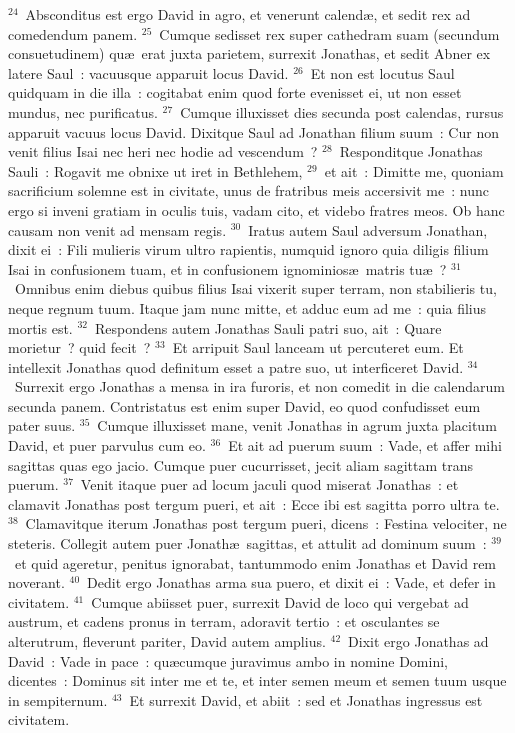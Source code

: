 ${}^{24}$~Absconditus est ergo David in agro, et venerunt calend\ae , et sedit rex ad comedendum panem.
${}^{25}$~Cumque sedisset rex super cathedram suam (secundum consuetudinem) qu\ae\ erat juxta parietem, surrexit Jonathas, et sedit Abner ex latere Saul~: vacuusque apparuit locus David.
${}^{26}$~Et non est locutus Saul quidquam in die illa~: cogitabat enim quod forte evenisset ei, ut non esset mundus, nec purificatus.
${}^{27}$~Cumque illuxisset dies secunda post calendas, rursus apparuit vacuus locus David. Dixitque Saul ad Jonathan filium suum~: Cur non venit filius Isai nec heri nec hodie ad vescendum~?
${}^{28}$~Responditque Jonathas Sauli~: Rogavit me obnixe ut iret in Bethlehem,
${}^{29}$~et ait~: Dimitte me, quoniam sacrificium solemne est in civitate, unus de fratribus meis accersivit me~: nunc ergo si inveni gratiam in oculis tuis, vadam cito, et videbo fratres meos. Ob hanc causam non venit ad mensam regis.
${}^{30}$~Iratus autem Saul adversum Jonathan, dixit ei~: Fili mulieris virum ultro rapientis, numquid ignoro quia diligis filium Isai in confusionem tuam, et in confusionem ignominios\ae\ matris tu\ae~?
${}^{31}$~Omnibus enim diebus quibus filius Isai vixerit super terram, non stabilieris tu, neque regnum tuum. Itaque jam nunc mitte, et adduc eum ad me~: quia filius mortis est.
${}^{32}$~Respondens autem Jonathas Sauli patri suo, ait~: Quare morietur~? quid fecit~?
${}^{33}$~Et arripuit Saul lanceam ut percuteret eum. Et intellexit Jonathas quod definitum esset a patre suo, ut interficeret David.
${}^{34}$~Surrexit ergo Jonathas a mensa in ira furoris, et non comedit in die calendarum secunda panem. Contristatus est enim super David, eo quod confudisset eum pater suus.
${}^{35}$~Cumque illuxisset mane, venit Jonathas in agrum juxta placitum David, et puer parvulus cum eo.
${}^{36}$~Et ait ad puerum suum~: Vade, et affer mihi sagittas quas ego jacio. Cumque puer cucurrisset, jecit aliam sagittam trans puerum.
${}^{37}$~Venit itaque puer ad locum jaculi quod miserat Jonathas~: et clamavit Jonathas post tergum pueri, et ait~: Ecce ibi est sagitta porro ultra te.
${}^{38}$~Clamavitque iterum Jonathas post tergum pueri, dicens~: Festina velociter, ne steteris. Collegit autem puer Jonath\ae\ sagittas, et attulit ad dominum suum~:
${}^{39}$~et quid ageretur, penitus ignorabat, tantummodo enim Jonathas et David rem noverant.
${}^{40}$~Dedit ergo Jonathas arma sua puero, et dixit ei~: Vade, et defer in civitatem.
${}^{41}$~Cumque abiisset puer, surrexit David de loco qui vergebat ad austrum, et cadens pronus in terram, adoravit tertio~: et osculantes se alterutrum, fleverunt pariter, David autem amplius.
${}^{42}$~Dixit ergo Jonathas ad David~: Vade in pace~: qu\ae cumque juravimus ambo in nomine Domini, dicentes~: Dominus sit inter me et te, et inter semen meum et semen tuum usque in sempiternum.
${}^{43}$~Et surrexit David, et abiit~: sed et Jonathas ingressus est civitatem.

